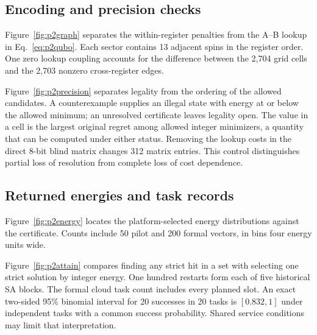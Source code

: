 \subsection{Encoding and precision checks}\label{app:p2encoding}
Figure~\ref{fig:p2graph} separates the within-register penalties from the A--B lookup in Eq.~\eqref{eq:p2qubo}. Each sector contains 13 adjacent spins in the register order. One zero lookup coupling accounts for the difference between the 2,704 grid cells and the 2,703 nonzero cross-register edges.

Figure~\ref{fig:p2precision} separates legality from the ordering of the allowed candidates. A counterexample supplies an illegal state with energy at or below the allowed minimum; an unresolved certificate leaves legality open. The value in a cell is the largest original regret among allowed integer minimizers, a quantity that can be computed under either status. Removing the lookup costs in the direct 8-bit blind matrix changes 312 matrix entries. This control distinguishes partial loss of resolution from complete loss of cost dependence.
\FloatBarrier

\subsection{Returned energies and task records}\label{app:p2returns}
Figure~\ref{fig:p2energy} locates the platform-selected energy distributions against the certificate. Counts include 50 pilot and 200 formal vectors, in bins four energy units wide.
\FloatBarrier

Figure~\ref{fig:p2attain} compares finding any strict hit in a set with selecting one strict solution by integer energy. One hundred restarts form each of five historical SA blocks. The formal cloud task count includes every planned slot. An exact two-sided 95\% binomial interval for 20 successes in 20 tasks is $[0.832,1]$ under independent tasks with a common success probability. Shared service conditions may limit that interpretation.

